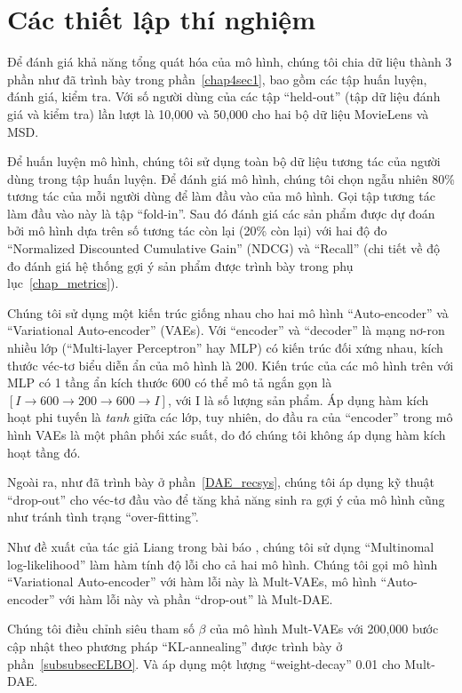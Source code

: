 \section{Các thiết lập thí nghiệm}
\label{setup_experiment}

Để đánh giá khả năng tổng quát hóa của mô hình, chúng tôi chia dữ liệu thành 3 phần như đã trình bày trong phần~\ref{chap4sec1}, bao gồm các tập huấn luyện, đánh giá, kiểm tra. Với số người dùng của các tập ``held-out'' (tập dữ liệu đánh giá và kiểm tra) lần lượt là 10,000 và 50,000 cho hai bộ dữ liệu MovieLens và MSD.

Để huấn luyện mô hình, chúng tôi sử dụng toàn bộ dữ liệu tương tác của người dùng trong tập huấn luyện. Để đánh giá mô hình, chúng tôi chọn ngẫu nhiên 80\% tương tác của mỗi người dùng để làm đầu vào của mô hình. Gọi tập tương tác làm đầu vào này là tập ``fold-in''. Sau đó đánh giá các sản phẩm được dự đoán bởi mô hình dựa trên số tương tác còn lại (20\% còn lại) với hai độ đo ``Normalized Discounted Cumulative Gain'' (NDCG) và ``Recall'' (chi tiết về độ đo đánh giá hệ thống gợi ý sản phẩm được trình bày trong phụ lục~\ref{chap_metrics}).

Chúng tôi sử dụng một kiến trúc giống nhau cho hai mô hình ``Auto-encoder'' và ``Variational Auto-encoder'' (VAEs). Với ``encoder'' và ``decoder'' là mạng nơ-ron nhiều lớp (``Multi-layer Perceptron'' hay MLP) có kiến trúc đối xứng nhau, kích thước véc-tơ biểu diễn ẩn của mô hình là 200. Kiến trúc của các mô hình trên với MLP có 1 tầng ẩn kích thước 600 có thể mô tả ngắn gọn là $[ I \to 600 \to 200 \to 600 \to I ]$, với I là số lượng sản phẩm. Áp dụng hàm kích hoạt phi tuyến là \textit{tanh} giữa các lớp, tuy nhiên, do đầu ra của ``encoder'' trong mô hình VAEs là một phân phối xác suất, do đó chúng tôi không áp dụng hàm kích hoạt tầng đó.

Ngoài ra, như đã trình bày ở phần~\ref{DAE_recsys}, chúng tôi áp dụng kỹ thuật ``drop-out'' cho véc-tơ đầu vào để tăng khả năng sinh ra gợi ý của mô hình cũng như tránh tình trạng ``over-fitting''.

Như đề xuất của tác giả Liang trong bài báo \cite{mvae}, chúng tôi sử dụng ``Multinomal log-likelihood'' làm hàm tính độ lỗi cho cả hai mô hình. Chúng tôi gọi mô hình ``Variational Auto-encoder'' với hàm lỗi này là Mult-VAEs, mô hình ``Auto-encoder'' với hàm lỗi này và phần ``drop-out'' là Mult-DAE.

Chúng tôi điều chỉnh siêu tham số $\beta$ của mô hình Mult-VAEs với 200,000 bước cập nhật theo phương pháp ``KL-annealing'' được trình bày ở phần~\ref{subsubsecELBO}. Và áp dụng một lượng ``weight-decay'' 0.01 cho Mult-DAE. 

